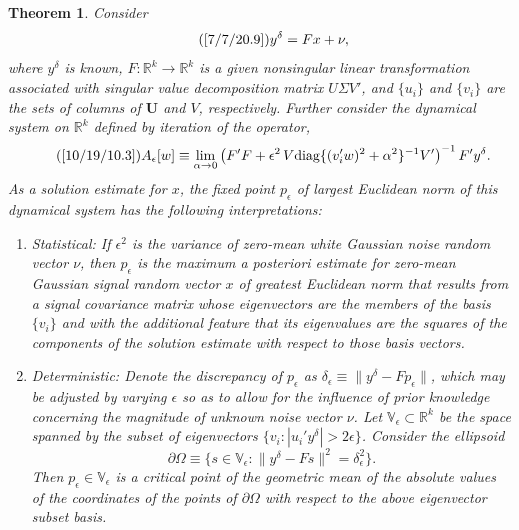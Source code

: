 \documentclass{amsart}
\numberwithin{equation}{section}
\newtheorem{theorem}{Theorem}
\theoremstyle{definition}
\numberwithin{theorem}{section}
\begin{document}
 \begin{theorem} \label{7/6/21.6} Consider \begin{equation} \tag{\ref{7/7/20.9}} y^\delta = F x +\nu, \end{equation} where $y^\delta$ is known, $F:\mathbb{R}^k\rightarrow\mathbb{R}^k$ is a given nonsingular linear transformation associated with singular value decomposition matrix $U\Sigma V'$, and $\{u_i\}$ and $\{v_i\}$ are the sets of columns of $\mathbf{U}$ and $V$, respectively.  Further consider the dynamical system on $\mathbb{R}^k$ defined by iteration of the operator, \begin{equation}\tag{\ref{10/19/10.3}} A_\epsilon[w] \equiv \lim_{\alpha\rightarrow 0}\left(F'F+\epsilon^2\, V\mbox{\rm diag}\{(v_i'w)^2 + \alpha^2\}^{-1}V' \right)^{-1} F'y^\delta. \end{equation} 
As a solution estimate for $x$, the fixed point $p_\epsilon$ of largest Euclidean norm of this dynamical system  has the following interpretations:
\begin{enumerate}\item {\rm Statistical:} If $\epsilon^2$ is the variance of zero-mean white Gaussian noise random vector $\nu$, then 
$p_\epsilon$ is the  {\rm maximum a posteriori} estimate for zero-mean Gaussian signal random vector $x$ of greatest Euclidean norm
 that results from a signal covariance matrix  whose eigenvectors are the members of the basis $\{v_i\}$ and with the additional feature that its eigenvalues are the squares of the components of the solution estimate with respect to those basis vectors.  \item  
{\rm Deterministic:} Denote the discrepancy of $p_\epsilon$ as $\delta_\epsilon \equiv \| y^\delta - Fp_\epsilon\|$, which may be adjusted by varying $\epsilon$ so as to allow for the influence of prior knowledge concerning the magnitude of unknown noise vector $\nu$.  Let $\mathbb{V}_\epsilon \subset \mathbb{R}^k$ be the space spanned by the subset of eigenvectors $\{v_i: |u_i'y^\delta| > 2\epsilon \}$.  
 Consider the ellipsoid \[ \partial\Omega \equiv \{ s\in \mathbb{V}_\epsilon: \| y^\delta - Fs\|^2 = \delta_\epsilon^2 \}.\]   Then $p_\epsilon\in \mathbb{V}_\epsilon$ is a critical point of the geometric mean of the absolute values of the coordinates of the points of $\partial\Omega$ with respect to the above eigenvector subset basis.
\end{enumerate}
\end{theorem}
\end{document}
